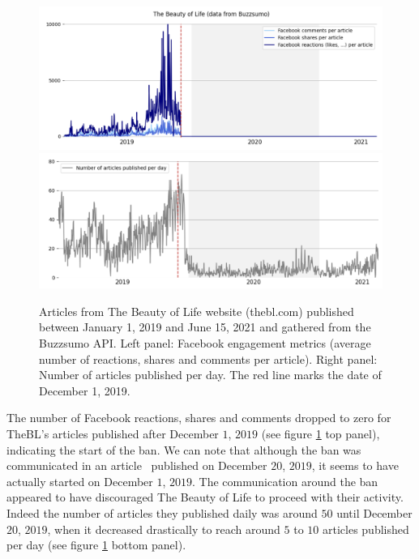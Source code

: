 \documentclass{article}
\begin{document}
\begin{figure}[h]
	\centering
	
		\includegraphics[scale=0.3]{./img/beautyoflife/fb_bl_1.png}
		\includegraphics[scale=0.3]{./img/beautyoflife/fb_bl_2.png} 
	
	\caption{Articles from The Beauty of Life website (thebl.com) published between January 1, 2019 and June 15, 2021 and gathered from the Buzzsumo API. Left panel: Facebook engagement metrics (average number of reactions, shares and comments per article). Right panel: Number of articles published per day. The red line marks the date of December 1, 2019. }
	\label{fb_bl}
\end{figure}

The number of Facebook reactions, shares and comments dropped to zero for TheBL’s articles published after December $1$, $2019$ (see figure \ref{fb_bl} top panel), indicating the start of the ban. We can note that although the ban was communicated in an article~\cite{newsroom1} published on December $20$, $2019$, it seems to have actually started on December $1$, $2019$. The communication around the ban appeared to have discouraged The Beauty of Life to proceed with their activity. Indeed the number of articles they published daily was around $50$ until December $20$, $2019$, when it decreased drastically to reach around $5$ to $10$ articles published per day (see figure \ref{fb_bl} bottom panel). 
\end{document}

